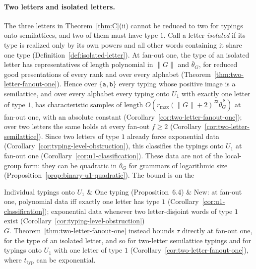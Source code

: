 \paragraph{Two letters and isolated letters.}
The three letters in Theorem~\ref{thm:C}(ii) cannot be reduced to two for
typings onto semilattices, and two of them must have type $1$.  Call a letter
\emph{isolated} if its type is realized only by its own powers and all other
words containing it share one type (Definition~\ref{def:isolated-letter}).  At
fan-out one, the type of an isolated letter has representatives of length
polynomial in $\|G\|$ and $\bar\theta_G$, for reduced good presentations of every
rank and over every alphabet (Theorem~\ref{thm:two-letter-fanout-one}).  Hence
over $\{\mathtt a,\mathtt b\}$ every typing whose positive image is a semilattice,
and over every alphabet every typing onto $U_1$ with exactly one letter of
type $1$, has characteristic samples of length
$O(r_{\max}(\|G\|+2)^{23}\bar\theta_G^{\,8})$ at fan-out one, with an absolute
constant (Corollary~\ref{cor:two-letter-fanout-one}); over two letters the same
holds at every fan-out $f\ge2$ (Corollary~\ref{cor:two-letter-semilattice}).
Since two letters of type $1$ already force exponential data
(Corollary~\ref{cor:typing-level-obstruction}), this classifies the typings onto
$U_1$ at fan-out one (Corollary~\ref{cor:u1-classification}).  These data are
not of the local-group form: they can be quadratic in $\bar\theta_G$ for
grammars of logarithmic size (Proposition~\ref{prop:binary-u1-quadratic}).
The bound is on the

Individual typings onto $U_1$
 & One typing (Proposition~6.4)
 & New: at fan-out one, polynomial data iff exactly one letter has type $1$
   (Corollary~\ref{cor:u1-classification}); exponential data whenever two
   letter-disjoint words of type $1$ exist
   (Corollary~\ref{cor:typing-level-obstruction})\\

$G$.  Theorem~\ref{thm:two-letter-fanout-one} instead bounds $\tau$ directly at
fan-out one, for the type of an isolated letter, and so for two-letter
semilattice typings and for typings onto $U_1$ with one letter of type $1$
(Corollary~\ref{cor:two-letter-fanout-one}), where $t_{\mathrm{typ}}$ can be
exponential.

